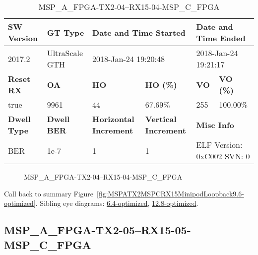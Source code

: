 \begin{table}[h]
\centering
\caption{MSP\_A\_FPGA-TX2-04--RX15-04-MSP\_C\_FPGA}
\label{tab:MSPAFPGATX204RX1504MSPCFPGA9.6-optimized}
\begin{tabular}{@{}|l|l|l|l|l|l|@{}}
\toprule
\textbf{SW Version}                & \textbf{GT Type}   & \multicolumn{2}{l|}{\textbf{Date and Time Started}}            & \multicolumn{2}{l|}{\textbf{Date and Time Ended}}        \\ \midrule
2017.2                       & UltraScale GTH          & \multicolumn{2}{l|}{2018-Jan-24 19:20:48}                   & \multicolumn{2}{l|}{2018-Jan-24 19:21:17}               \\ \midrule
\textbf{Reset RX}                  & \textbf{OA} & \textbf{HO}   & \textbf{HO (\%)} & \textbf{VO} & \textbf{VO (\%)} \\ \midrule
true & 9961        & 44          & 67.69\%        & 255        & 100.00\%       \\ \midrule
\textbf{Dwell Type}                & \textbf{Dwell BER} & \textbf{Horizontal Increment} & \textbf{Vertical Increment}    & \multicolumn{2}{l|}{\textbf{Misc Info}}                  \\ \midrule
BER                            & 1e-7        & 1        & 1           & \multicolumn{2}{l|}{ELF Version: 0xC002 SVN: 0}                         \\ \bottomrule
\end{tabular}
\end{table}

\begin{figure}[h]
\caption{MSP\_A\_FPGA-TX2-04--RX15-04-MSP\_C\_FPGA} \label{fig:MSPAFPGATX204RX1504MSPCFPGA9.6-optimized}
\end{figure}

Call back to summary Figure~\ref{fig:MSPATX2MSPCRX15MinipodLoopback9.6-optimized}.
Sibling eye diagrams: \hyperref[sec:MSPAFPGATX204RX1504MSPCFPGA6.4-optimized]{6.4-optimized}, \hyperref[sec:MSPAFPGATX204RX1504MSPCFPGA12.8-optimized]{12.8-optimized}.

\clearpage
\newpage


\subsection{MSP\_A\_FPGA-TX2-05--RX15-05-MSP\_C\_FPGA}\label{sec:MSPAFPGATX205RX1505MSPCFPGA9.6-optimized}

